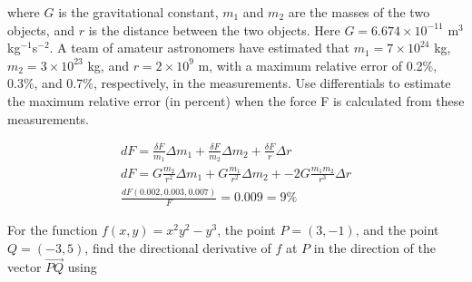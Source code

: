 \documentclass[12pt]{exam}
\begin{document}
\begin{questions}
where $G$ is the gravitational constant, $m_1$ and $m_2$ are the masses of the two objects, and $r$ is the distance between the two objects. Here $G = 6.674 \times 10^{- 11}$ m$^3$kg$^{-1}$s$^{-2}$. A team of amateur astronomers have
estimated that $m_1 = 7 \times 10^{24}$ kg, $m_2 = 3 \times 10^{23}$ kg, and $r = 2 \times 10^9$ m, with a maximum relative error of 0.2\%, 0.3\%, and 0.7\%, respectively, in the measurements. Use differentials to estimate the maximum
relative error (in percent) when the force F is calculated from these measurements.
	\begin{solution}
		\begin{gather*}
			dF = \frac{\delta F}{m_1}\Delta m_1 + \frac{\delta F}{m_2}\Delta m_2 + \frac{\delta F}{r}\Delta r\\
			dF = G\frac{m_2}{r^2}\Delta m_1 + G\frac{m_1}{r^2}\Delta m_2 + -2G\frac{m_1m_2}{r^3}\Delta r\\
			\boxed{\frac{dF(0.002, 0.003, 0.007)}{F} = 0.009 = 9\%} \tag*{\qed}
		\end{gather*}
	\end{solution}
\question For the function $f(x, y) = x^2y^2 - y^3$, the point $P = (3, -1)$, and the point $Q = (-3, 5)$, find the
directional derivative of $f$ at $P$ in the direction of the vector $\overrightarrow{PQ}$ using
\end{questions}
\end{document}
